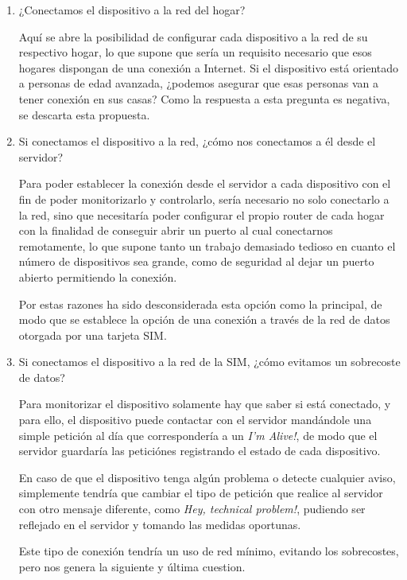\begin{enumerate}
    \item ¿Conectamos el dispositivo a la red del hogar? 
    
    Aquí se abre la posibilidad de configurar cada dispositivo a la red de su respectivo hogar, lo que supone que sería un requisito necesario que esos hogares dispongan de una conexión a Internet. Si el dispositivo está orientado a personas de edad avanzada, ¿podemos asegurar que esas personas van a tener conexión en sus casas? Como la respuesta a esta pregunta es negativa, se descarta esta propuesta.
    
    \item Si conectamos el dispositivo a la red, ¿cómo nos conectamos a él desde el servidor?
    
    Para poder establecer la conexión desde el servidor a cada dispositivo con el fin de poder monitorizarlo y controlarlo, sería necesario no solo conectarlo a la red, sino que necesitaría poder configurar el propio router de cada hogar con la finalidad de conseguir abrir un puerto al cual conectarnos remotamente, lo que supone tanto un trabajo demasiado tedioso en cuanto el número de dispositivos sea grande, como de seguridad al dejar un puerto abierto permitiendo la conexión.
    
    Por estas razones ha sido desconsiderada esta opción como la principal, de modo que se establece la opción de una conexión a través de la red de datos otorgada por una tarjeta SIM.  
    
    \item Si conectamos el dispositivo a la red de la SIM, ¿cómo evitamos un sobrecoste de datos?
    
    Para monitorizar el dispositivo solamente hay que saber si está conectado, y para ello, el dispositivo puede contactar con el servidor mandándole una simple petición al día que correspondería a un \textit{ I'm Alive!}, de modo que el servidor guardaría las peticiónes registrando el estado de cada dispositivo.
    
    En caso de que el dispositivo tenga algún problema o detecte cualquier aviso, simplemente tendría que cambiar el tipo de petición que realice al servidor con otro mensaje diferente, como \textit{Hey, technical problem!}, pudiendo ser reflejado en el servidor y tomando las medidas oportunas.
    
    Este tipo de conexión tendría un uso de red mínimo, evitando los sobrecostes, pero nos genera la siguiente y última cuestion.
    

\end{enumerate}
